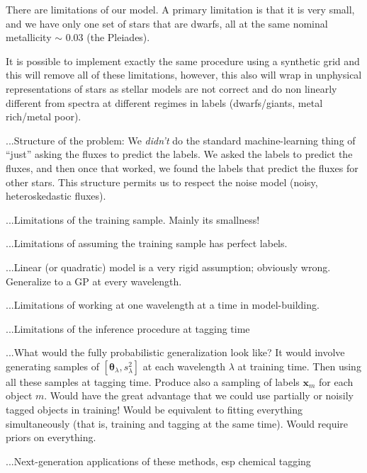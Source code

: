 \documentclass[12pt, preprint]{aastex}
\newcommand{\set}[1]{\bm{#1}}
\begin{document}
There are limitations of our model. A primary limitation is that it is very small, and we have only one set of stars that are dwarfs, all at the same nominal metallicity $\sim$ 0.03 (the Pleiades). 

It is possible to implement exactly the same procedure using a synthetic grid and this will remove all of these limitations, however, this also will wrap in unphysical representations of stars as stellar models are not correct and do non linearly different from spectra at different regimes in labels (dwarfs/giants, metal rich/metal poor). 

...Structure of the problem:
We \emph{didn't} do the standard machine-learning thing of ``just'' asking the fluxes to predict the labels.
We asked the labels to predict the fluxes, and then once that worked, we found the labels that predict the fluxes for other stars.
This structure permits us to respect the noise model (noisy, heteroskedastic fluxes).

...Limitations of the training sample.  Mainly its smallness!

...Limitations of assuming the training sample has perfect labels.

...Linear (or quadratic) model is a very rigid assumption; obviously wrong.
Generalize to a GP at every wavelength.

...Limitations of working at one wavelength at a time in model-building.

...Limitations of the inference procedure at tagging time

...What would the fully probabilistic generalization look like?
It would involve generating samples of $[\set{\theta}_\lambda, s_\lambda^2]$ at each wavelength $\lambda$ at training time.
Then using all these samples at tagging time.
Produce also a sampling of labels $\set{x}_m$ for each object $m$.
Would have the great advantage that we could use partially or noisily tagged objects in training!
Would be equivalent to fitting everything simultaneously (that is, training and tagging at the same time).
Would require priors on everything.

...Next-generation applications of these methods, esp chemical tagging
\end{document}
